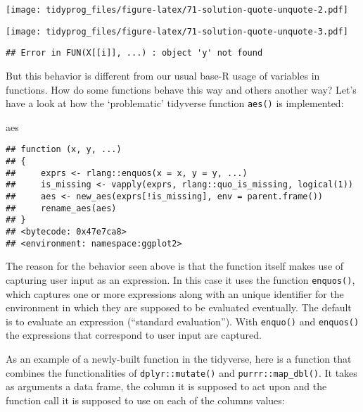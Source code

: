 \documentclass[]{book}
\newenvironment{Shaded}{\begin{snugshade}}{\end{snugshade}}
\newcommand{\KeywordTok}[1]{\textcolor[rgb]{0.13,0.29,0.53}{\textbf{#1}}}
\newcommand{\NormalTok}[1]{#1}
\newcommand{\OperatorTok}[1]{\textcolor[rgb]{0.81,0.36,0.00}{\textbf{#1}}}
\newcommand{\StringTok}[1]{\textcolor[rgb]{0.31,0.60,0.02}{#1}}
\begin{document}
\texttt{[image: tidyprog\_files/figure-latex/71-solution-quote-unquote-2.pdf]}

\begin{Shaded}
\end{Shaded}

\texttt{[image: tidyprog\_files/figure-latex/71-solution-quote-unquote-3.pdf]}

\begin{verbatim}
## Error in FUN(X[[i]], ...) : object 'y' not found
\end{verbatim}

But this behavior is different from our usual base-R usage of variables in functions.
How do some functions behave this way and others another way?
Let's have a look at how the `problematic' tidyverse function \texttt{aes()} is implemented:

\begin{Shaded}
\begin{Highlighting}[]
\NormalTok{aes}
\end{Highlighting}
\end{Shaded}

\begin{verbatim}
## function (x, y, ...) 
## {
##     exprs <- rlang::enquos(x = x, y = y, ...)
##     is_missing <- vapply(exprs, rlang::quo_is_missing, logical(1))
##     aes <- new_aes(exprs[!is_missing], env = parent.frame())
##     rename_aes(aes)
## }
## <bytecode: 0x47e7ca8>
## <environment: namespace:ggplot2>
\end{verbatim}

The reason for the behavior seen above is that the function itself makes use of capturing user input as an expression.
In this case it uses the function \texttt{enquos()}, which captures one or more expressions along with an unique identifier for the environment in which they are supposed to be evaluated eventually.
The default is to evaluate an expression (``standard evaluation'').
With \texttt{enquo()} and \texttt{enquos()} the expressions that correspond to user input are captured.

As an example of a newly-built function in the tidyverse, here is a function that combines the functionalities of \texttt{dplyr::mutate()} and \texttt{purrr::map\_dbl()}.
It takes as arguments a data frame, the column it is supposed to act upon and the function call it is supposed to use on each of the columns values:
\end{document}
